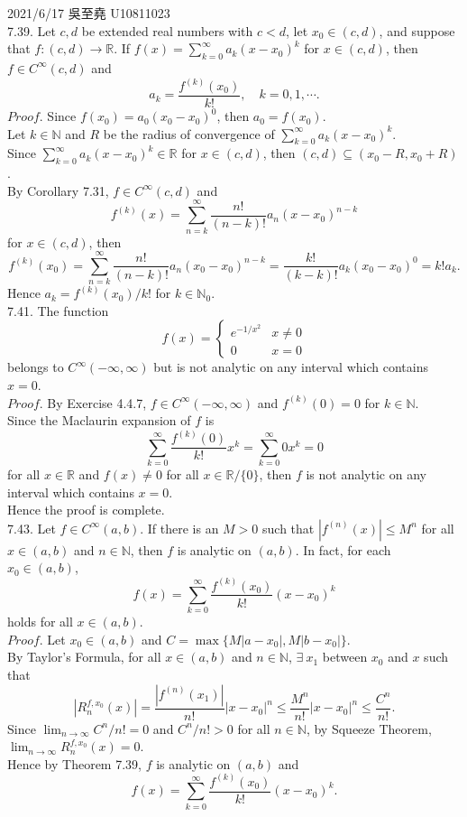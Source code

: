\documentclass[12pt]{book}
\author{andersonwu2000}
\begin{document}
\begin{CJK}{UTF8}{bsmi}

\hfill 2021/6/17 吳至堯 U10811023 \\

7.39. Let $c, d$ be extended real numbers with $c<d$, let $x_0\in(c, d)$, and suppose that $f:(c, d)\rightarrow\mathbb{R}$. If $f(x) = \sum_{k=0}^\infty a_k (x-x_0)^k$ for $x\in(c, d)$, then $f\in C^\infty (c, d)$ and
\[
    a_k = \frac{f^{(k)}(x_0)}{k!},\quad k=0, 1, \cdots.
\]
$Proof$. Since $f(x_0) = a_0(x_0-x_0)^0$, then $a_0 = f(x_0)$. \\
Let $k\in\mathbb{N}$ and $R$ be the radius of convergence of $\sum_{k=0}^\infty a_k (x-x_0)^k$. \\
Since $\sum_{k=0}^\infty a_k (x-x_0)^k\in\mathbb{R}$ for $x\in(c, d)$, then $(c, d)\subseteq(x_0-R, x_0+R)$. \\
By Corollary 7.31, $f\in C^\infty(c, d)$ and
\[
    f^{(k)}(x)
    = \sum_{n=k}^\infty \frac{n!}{(n-k)!} a_n (x-x_0)^{n-k}
\]
for $x\in(c, d)$, then
\[
    f^{(k)}(x_0)
    = \sum_{n=k}^\infty \frac{n!}{(n-k)!} a_n (x_0-x_0)^{n-k}
    = \frac{k!}{(k-k)!} a_k (x_0-x_0)^0
    = k! a_k.
\]
Hence $a_k = f^{(k)}(x_0) / k!$ for $k\in\mathbb{N}_0$. \\

7.41. The function
\[
    f(x) = \left\{\begin{matrix}
        e^{-1/x^2} & x\ne0 \\
        0 & x=0
    \end{matrix}\right.
\]
belongs to $C^\infty(-\infty, \infty)$ but is not analytic on any interval which contains $x=0$. \\
$Proof$. By Exercise 4.4.7, $f\in C^\infty(-\infty, \infty)$ and $f^{(k)}(0)=0$ for $k\in\mathbb{N}$. \\
Since the Maclaurin expansion of $f$ is
\[
    \sum_{k=0}^\infty \frac{f^{(k)}(0)}{k!} x^k
    = \sum_{k=0}^\infty 0 x^k
    = 0
\]
for all $x\in\mathbb{R}$ and $f(x)\ne0$ for all $x\in\mathbb{R}/\{0\}$, then $f$ is not analytic on any interval which contains $x=0$. \\
Hence the proof is complete. \\

7.43. Let $f\in C^\infty(a, b)$. If there is an $M>0$ such that $|f^{(n)}(x)| \le M^n$ for all $x\in(a, b)$ and $n\in\mathbb{N}$, then $f$ is analytic on $(a, b)$. In fact, for each $x_0\in(a, b)$,
\[
    f(x)
    = \sum_{k=0}^\infty \frac{f^{(k)}(x_0)}{k!} (x-x_0)^k
\]
holds for all $x\in(a, b)$. \\
$Proof$. Let $x_0\in(a, b)$ and $C=\max\{M|a-x_0|, M|b-x_0|\}$. \\
By Taylor's Formula, for all $x\in(a, b)$ and $n\in\mathbb{N}$, $\exists\ x_1$ between $x_0$ and $x$ such that
\[
    |R^{f, x_0}_n(x)|
    = \frac{|f^{(n)}(x_1)|}{n!} |x-x_0|^n
    \le \frac{M^n}{n!} |x-x_0|^n
    \le \frac{C^n}{n!}.
\]
Since $\lim_{n\rightarrow\infty} C^n/n! = 0$ and $C^n/n!>0$ for all $n\in\mathbb{N}$, by  Squeeze Theorem, $\lim_{n\rightarrow\infty} R^{f, x_0}_n (x) = 0$. \\
Hence by Theorem 7.39, $f$ is analytic on $(a, b)$ and 
\[
    f(x)
    = \sum_{k=0}^\infty \frac{f^{(k)}(x_0)}{k!} (x-x_0)^k.
\]


\end{CJK}
\end{document}
